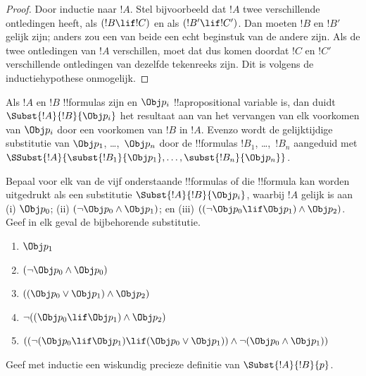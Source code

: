 \documentclass[openany]{memoir}
\begin{document}
\begin{proof}
Door inductie naar $!A$. Stel bijvoorbeeld dat $!A$ twee verschillende
ontledingen heeft, als $(!B \lif !C)$ en als $(!B' \lif !C')$. Dan
moeten $!B$ en $!B'$ gelijk zijn; anders zou een van beide een echt
beginstuk van de andere zijn. Als de twee ontledingen van $!A$
verschillen, moet dat dus komen doordat $!C$ en $!C'$ verschillende
ontledingen van dezelfde tekenreeks zijn. Dit is volgens de
inductiehypothese onmogelijk.
\end{proof}


\begin{defn}
Als $!A$ en $!B$ !!{formula}s zijn en $\Obj p_i$ !!a{propositional
  variable} is, dan duidt $\Subst{!A}{!B}{\Obj p_i}$ het resultaat aan
  van het vervangen van elk voorkomen van $\Obj p_i$ door een voorkomen
  van $!B$ in $!A$. Evenzo wordt de gelijktijdige substitutie van
$\Obj p_1$, \dots,~$\Obj p_n$ door de !!{formula}s $!B_1$,
\dots,~$!B_n$ aangeduid met
$\SSubst{!A}{\subst{!B_1}{\Obj p_1},\dots,\subst{!B_n}{\Obj p_n}}$.
\end{defn}

\begin{prob} Bepaal voor elk van de vijf onderstaande !!{formula}s of
 die !!{formula} kan worden uitgedrukt als een substitutie
 \( \Subst{!A}{!B}{\Obj p_i} \), waarbij \( !A \) gelijk is aan (i)
 \( \Obj p_0 \); (ii) \( ( \lnot \Obj p_0 \land \Obj p_1) \); en (iii)
 \( ( ( \lnot \Obj p_0 \lif \Obj p_1 ) \land \Obj p_2 ) \). Geef in
  elk geval de bijbehorende substitutie.
  \begin{enumerate}
    \item \( \Obj p_1 \) 
    \item \( ( \lnot \Obj p_0 \land \Obj p_0 ) \)
    \item \( ( ( \Obj p_0 \lor \Obj p_1 ) \land \Obj p_2 )  \)
    \item \( \lnot ( ( \Obj p_0 \lif \Obj p_1 ) \land \Obj p_2 ) \)
    \item \( (( \lnot ( \Obj p_0 \lif \Obj p_1 ) \lif ( \Obj p_0 \lor \Obj p_1 )) \land \lnot ( \Obj p_0 \land \Obj p_1 )) \)
  \end{enumerate}
\end{prob}

\begin{prob}
Geef met inductie een wiskundig precieze definitie van
$\Subst{!A}{!B}{p}$.
\end{prob}
\endgroup
\end{document}

